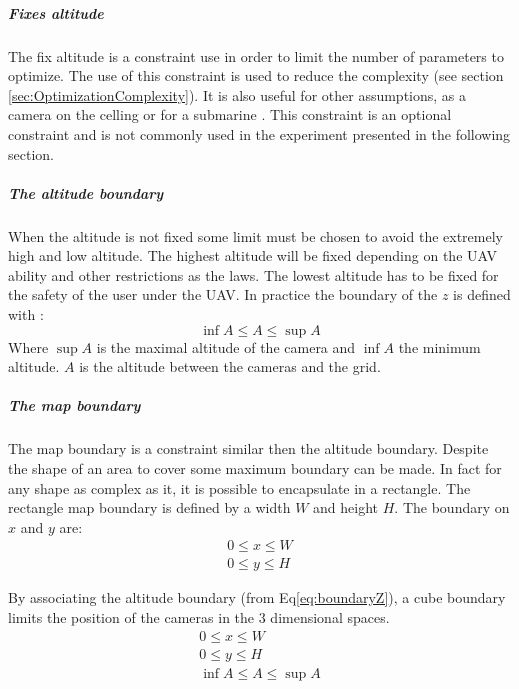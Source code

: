 \subparagraph{Fixes altitude}
 The fix altitude is a constraint use in order to limit the number of parameters to optimize. The use of this constraint is used to reduce the complexity (see section \ref{sec:OptimizationComplexity}). It is also useful for other assumptions, as a camera on the celling or for a submarine  \cite{66*galceran2013}. This constraint is an optional constraint and is not commonly used in the experiment presented in the following section.   

\subparagraph{The altitude boundary}\label{sec:altitudeBoundary}
 When the altitude is not fixed some limit must be chosen to avoid the extremely high and low altitude. The highest altitude will be fixed depending on the UAV ability and other restrictions as the laws. The lowest altitude has to be fixed for the safety of the user under the UAV.  
In practice the boundary of the $z$ is defined with :
 \begin{equation}\label{eq:boundaryZ}
   \inf A\leq A\leq \sup A  
 \end{equation} 
 Where $\sup A$ is the maximal altitude of the camera and $\inf A$ the minimum altitude. $A$ is the altitude between the cameras and the grid. %
 
 \subparagraph{The map boundary}
The map boundary is a constraint similar then the altitude boundary. Despite the shape of an area to cover some maximum boundary can be made. In fact for any shape as complex as it, it is  possible to encapsulate in a rectangle. The rectangle map boundary is defined by a width $W$ and height $H$. The boundary on $x$ and $y$ are:
 \begin{equation}
  \begin{array}{lcl}
  	0\leq x\leq W \\
  	 0\leq y\leq H 
  \end{array} 
 \end{equation}  
 
By associating the altitude boundary (from Eq\ref{eq:boundaryZ}), a cube boundary limits the position of the cameras in the 3 dimensional spaces. 
\begin{equation}\label{eq:3dBoundary}
  \begin{array}{lclcl}
  	0\leq x\leq W \\ 0\leq y\leq H  \\ \inf A\leq A\leq \sup A  
  \end{array} 
 \end{equation} 
 
